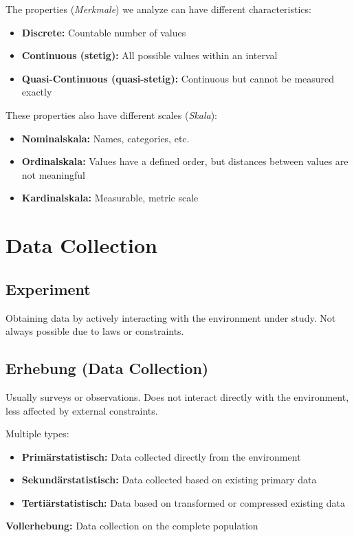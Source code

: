 \documentclass{article}
\begin{document}
The properties (\textit{Merkmale}) we analyze can have different characteristics:
\begin{itemize}
  \item \textbf{Discrete:} Countable number of values
  \item \textbf{Continuous (stetig):} All possible values within an interval
  \item \textbf{Quasi-Continuous (quasi-stetig):} Continuous but cannot be measured exactly
\end{itemize}

These properties also have different scales (\textit{Skala}):
\begin{itemize}
  \item \textbf{Nominalskala:} Names, categories, etc.
  \item \textbf{Ordinalskala:} Values have a defined order, but distances between values are not meaningful
  \item \textbf{Kardinalskala:} Measurable, metric scale
\end{itemize}

\section{Data Collection}
\subsection{Experiment}
Obtaining data by actively interacting with the environment under study. Not always possible due to laws or constraints.

\subsection{Erhebung (Data Collection)}
Usually surveys or observations. Does not interact directly with the environment, less affected by external constraints.

Multiple types:
\begin{itemize}
  \item \textbf{Primärstatistisch:} Data collected directly from the environment
  \item \textbf{Sekundärstatistisch:} Data collected based on existing primary data
  \item \textbf{Tertiärstatistisch:} Data based on transformed or compressed existing data
\end{itemize}

\textbf{Vollerhebung:} Data collection on the complete population
\end{document}

